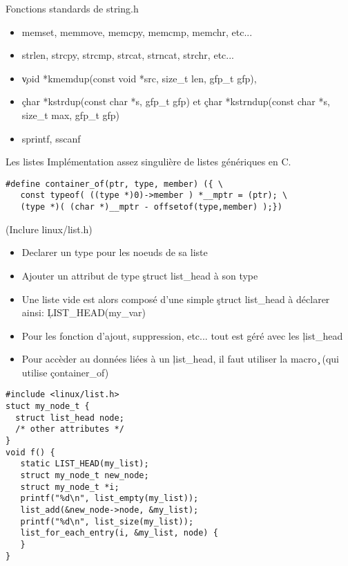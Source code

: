  

\begin{frame}{Fonctions standards de string.h}
\begin{itemize} 
\item memset, memmove, memcpy, memcmp, memchr, etc...
\item strlen, strcpy, strcmp, strcat, strncat, strchr, etc...
\item  \c{void  *kmemdup(const void  *src,  size_t  len, gfp_t  gfp)},
\item \c{char *kstrdup(const char   *s,   gfp_t   gfp)}   et   \c{char
    *kstrndup(const char *s, size_t max, gfp_t gfp)}
\item sprintf, sscanf
\end{itemize} 
\end{frame} 

\begin{frame}{Les listes}
Implémentation assez singulière de listes génériques en C. 
\begin{lstlisting} 
#define container_of(ptr, type, member) ({ \ 
   const typeof( ((type *)0)->member ) *__mptr = (ptr); \
   (type *)( (char *)__mptr - offsetof(type,member) );})
\end{lstlisting} 
(Inclure linux/list.h)
\begin{itemize}
\item Declarer un type pour les noeuds de sa liste
\item Ajouter un attribut de type \c{struct list_head} à son type

\item Une liste vide est alors composé d'une simple \c{struct list_head} à déclarer ainsi: \c{LIST_HEAD(my_var)}
\item Pour les fonction d'ajout, suppression, etc... tout est géré avec les \c{list_head}
\item Pour accèder au données liées à un \c{list_head}, il faut utiliser la macro \c{} (qui utilise \c{container_of})
\end{itemize} 
\begin{lstlisting}
#include <linux/list.h>
stuct my_node_t {
  struct list_head node;
  /* other attributes */
}
void f() {
   static LIST_HEAD(my_list);
   struct my_node_t new_node; 
   struct my_node_t *i; 
   printf("%d\n", list_empty(my_list));
   list_add(&new_node->node, &my_list);
   printf("%d\n", list_size(my_list));
   list_for_each_entry(i, &my_list, node) {
   }
} 
\end{lstlisting} 
\end{frame} 

